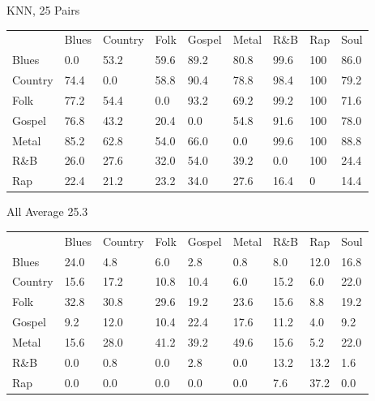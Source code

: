 \documentclass[a4paper,oneside]{article}
\begin{document}
KNN, 25
Pairs
\begin{table}
\begin{tabular}{|l||*{8}{l|}} \hline
 & Blues & Country & Folk & Gospel & Metal & R\&B & Rap & Soul \\ \hhline{|=||*{8}{=|}}
Blues & 0.0 & 53.2 & 59.6 & 89.2 & 80.8 & 99.6 & 100 & 86.0 \\ \hline
Country & 74.4 & 0.0 & 58.8 & 90.4 & 78.8 & 98.4 & 100 & 79.2 \\ \hline
Folk & 77.2 & 54.4 & 0.0 & 93.2 & 69.2 & 99.2 & 100 & 71.6 \\ \hline
Gospel & 76.8 & 43.2 & 20.4 & 0.0 & 54.8 & 91.6 & 100 & 78.0 \\ \hline
Metal & 85.2 & 62.8 & 54.0 & 66.0 & 0.0 & 99.6 & 100 & 88.8 \\ \hline
R\&B & 26.0 & 27.6 & 32.0 & 54.0 & 39.2 & 0.0 & 100 & 24.4 \\ \hline
Rap & 22.4 & 21.2 & 23.2 & 34.0 & 27.6 & 16.4 & 0 & 14.4 \\ \hline
\end{tabular}
\end{table}

All
Average 25.3
\begin{table}
\begin{tabular}{|l||*{8}{l|}} \hline
 & Blues & Country & Folk & Gospel & Metal & R\&B & Rap & Soul \\ \hhline{|=||*{8}{=|}}
Blues & 24.0 & 4.8 & 6.0 & 2.8 & 0.8 & 8.0 & 12.0 & 16.8 \\ \hline
Country & 15.6 & 17.2 & 10.8 & 10.4 & 6.0 & 15.2 & 6.0 & 22.0 \\ \hline
Folk & 32.8 & 30.8 & 29.6 & 19.2 & 23.6 & 15.6 & 8.8 & 19.2 \\ \hline
Gospel & 9.2 & 12.0 & 10.4 & 22.4 & 17.6 & 11.2 & 4.0 & 9.2 \\ \hline
Metal & 15.6 & 28.0 & 41.2 & 39.2 & 49.6 & 15.6 & 5.2 & 22.0 \\ \hline
R\&B & 0.0 & 0.8 & 0.0 & 2.8 & 0.0 & 13.2 & 13.2 & 1.6 \\ \hline
Rap & 0.0 & 0.0 & 0.0 & 0.0 & 0.0 & 7.6 & 37.2 & 0.0 \\ \hline
\end{tabular}
\end{table}
\end{document}
